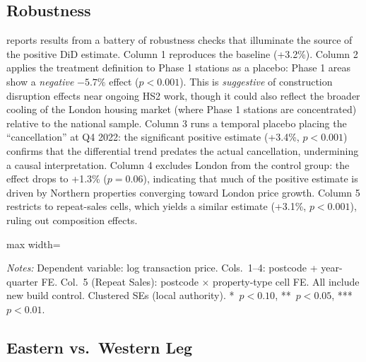 \documentclass[12pt]{article}
\begin{document}
\subsection{Robustness}

 reports results from a battery of robustness checks that illuminate the source of the positive DiD estimate. Column 1 reproduces the baseline (+3.2\%). Column 2 applies the treatment definition to Phase 1 stations as a placebo: Phase 1 areas show a \textit{negative} $-5.7\%$ effect ($p < 0.001$). This is \textit{suggestive} of construction disruption effects near ongoing HS2 work, though it could also reflect the broader cooling of the London housing market (where Phase 1 stations are concentrated) relative to the national sample. Column 3 runs a temporal placebo placing the ``cancellation'' at Q4 2022: the significant positive estimate (+3.4\%, $p < 0.001$) confirms that the differential trend predates the actual cancellation, undermining a causal interpretation. Column 4 excludes London from the control group: the effect drops to +1.3\% ($p = 0.06$), indicating that much of the positive estimate is driven by Northern properties converging toward London price growth. Column 5 restricts to repeat-sales cells, which yields a similar estimate (+3.1\%, $p < 0.001$), ruling out composition effects.

\begin{table}[H]
\centering
\caption{Robustness Checks and Placebo Tests}
\begin{threeparttable}
\begin{adjustbox}{max width=\textwidth}

\end{adjustbox}
\begin{tablenotes}[flushleft]
\small
\item \textit{Notes:} Dependent variable: log transaction price. Cols.\ 1--4: postcode + year-quarter FE. Col.\ 5 (Repeat Sales): postcode $\times$ property-type cell FE. All include new build control. Clustered SEs (local authority). {*}~$p<0.10$, {**}~$p<0.05$, {***}~$p<0.01$.
\end{tablenotes}
\end{threeparttable}
\label{tab:robustness}
\end{table}

\subsection{Eastern vs.\ Western Leg}
\end{document}
